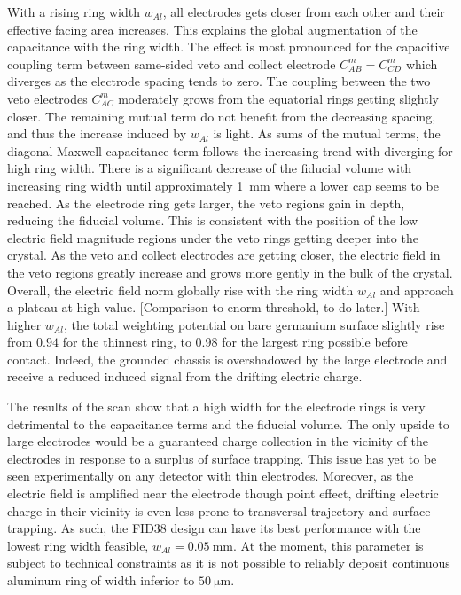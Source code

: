 With a rising ring width $w_{Al}$, all electrodes gets closer from each other and their effective facing area increases. This explains the global augmentation of the capacitance with the ring width. The effect is most pronounced for the capacitive coupling term between same-sided veto and collect electrode $C_{AB}^m=C_{CD}^m$ which diverges as the electrode spacing tends to zero. The coupling between the two veto electrodes $C_{AC}^m$ moderately grows from the equatorial rings getting slightly closer. The remaining mutual term do not benefit from the decreasing spacing, and thus the increase induced by $w_{Al}$ is light. As sums of the mutual terms, the diagonal Maxwell capacitance term follows the increasing trend with diverging for high ring width.
There is a significant decrease of the fiducial volume with increasing ring width until approximately \SI{1}{\mm} where a lower cap seems to be reached. As the electrode ring gets larger, the veto regions gain in depth, reducing the fiducial volume. 
This is consistent with the position of the low electric field magnitude regions under the veto rings getting deeper into the crystal. As the veto and collect electrodes are getting closer, the electric field in the veto regions greatly increase and grows more gently in the bulk of the crystal. Overall, the electric field norm globally rise with the ring width $w_{Al}$ and approach a plateau at high value. {\color{red} [Comparison to enorm threshold, to do later.]}
With higher $w_{Al}$, the total weighting potential on bare germanium surface slightly rise from $0.94$ for the thinnest ring, to $0.98$ for the largest ring possible before contact. Indeed, the grounded chassis is overshadowed by the large electrode and receive a reduced induced signal from the drifting electric charge.

The results of the scan show that a high width for the electrode rings is very detrimental to the capacitance terms and the fiducial volume. The only upside to large electrodes would be a guaranteed charge collection in the vicinity of the electrodes in response to a surplus of surface trapping. This issue has yet to be seen experimentally on any detector with thin electrodes. Moreover, as the electric field is amplified near the electrode though point effect, drifting electric charge in their vicinity is even less prone to transversal trajectory and surface trapping. As such, the FID38 design can have its best performance with the lowest ring width feasible, $w_{Al}=\SI{0.05}{\mm}$. At the moment, this parameter is subject to technical constraints as it is not possible to reliably deposit continuous aluminum ring of width inferior to $\SI{50}{\micro\meter}$. 


